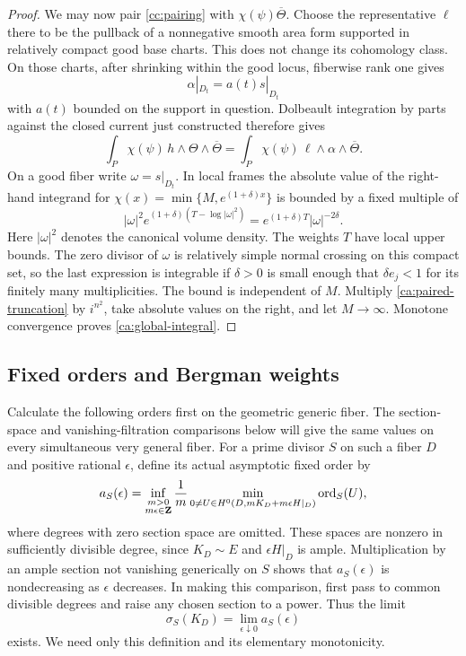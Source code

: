 \begin{proof}
We may now pair \eqref{cc:pairing} with
\(\chi(\psi)\overline\Theta\).  Choose the representative \(\ell\)
there to be the pullback of a nonnegative smooth area form supported
in relatively compact good base charts.  This does not change its
cohomology class.  On those charts, after shrinking within the good
locus, fiberwise rank one gives
\[
 \alpha|_{D_t}=a(t)s|_{D_t}
\]
with \(a(t)\) bounded on the support in question.  Dolbeault
integration by parts against the closed current just constructed
therefore gives
\begin{equation}\label{ca:paired-truncation}
 \int_P \chi(\psi)\,h\wedge\Theta\wedge\overline\Theta
 =\int_P\chi(\psi)\,\ell\wedge\alpha\wedge\overline\Theta.
\end{equation}
On a good fiber write \(\omega=s|_{D_t}\).  In local frames the
absolute value of the right-hand integrand for
\(\chi(x)=\min\{M,e^{(1+\delta)x}\}\) is bounded by a fixed multiple of
\[
 |\omega|^2 e^{(1+\delta)(T-\log|\omega|^2)}
   =e^{(1+\delta)T}|\omega|^{-2\delta}.
\]
Here \(|\omega|^2\) denotes the canonical volume density.
The weights \(T\) have local upper bounds.  The zero divisor of
\(\omega\) is relatively simple normal crossing on this compact
set, so the last expression is integrable if \(\delta>0\) is small
enough that \(\delta e_j<1\) for its finitely many multiplicities.
The bound is independent of \(M\).  Multiply
\eqref{ca:paired-truncation} by \(i^{n^2}\), take absolute values on
the right, and let \(M\to\infty\).  Monotone convergence proves
\eqref{ca:global-integral}.
\end{proof}

\subsection{Fixed orders and Bergman weights}

Calculate the following orders first on the geometric generic fiber.
The section-space and vanishing-filtration comparisons below will
give the same values on every simultaneous very general fiber.
For a prime divisor \(S\) on such a fiber \(D\) and positive rational
\(\epsilon\), define its actual asymptotic fixed order by
\[
 a_S(\epsilon)=
 \inf_{\substack{m>0\\m\epsilon\in\mathbf Z}}
 \frac{1}{m}\min_{0\ne U\in
 H^0(D,mK_D+m\epsilon H|_D)}\operatorname{ord}_S(U),
\]
where degrees with zero section space are omitted.  These spaces
are nonzero in sufficiently divisible degree, since \(K_D\sim E\)
and \(\epsilon H|_D\) is ample.  Multiplication by an ample
section not vanishing generically on \(S\) shows that
\(a_S(\epsilon)\) is nondecreasing as \(\epsilon\) decreases.
In making this comparison, first pass to common divisible degrees
and raise any chosen section to a power.  Thus the limit
\[
 \sigma_S(K_D)=\lim_{\epsilon\downarrow0}a_S(\epsilon)
\]
exists. We need only this definition and its elementary
monotonicity.

